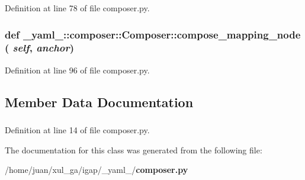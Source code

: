 Definition at line 78 of file composer.py.
\subsubsection{\setlength{\rightskip}{0pt plus 5cm}def \_\-yaml\_\-::composer::Composer::compose\_\-mapping\_\-node ( {\em self},  {\em anchor})}\label{class__yaml___1_1composer_1_1Composer_786cdc3fde28747d405f0c00c54067e3}




Definition at line 96 of file composer.py.

\subsection{Member Data Documentation}
\subsubsection{}\label{class__yaml___1_1composer_1_1Composer_c04caf2b0ac75bd138dd1bc7916eaca7}




Definition at line 14 of file composer.py.

The documentation for this class was generated from the following file:\begin{CompactItemize}
\item 
/home/juan/xul\_\-ga/igap/\_\-yaml\_\-/{\bf composer.py}\end{CompactItemize}
